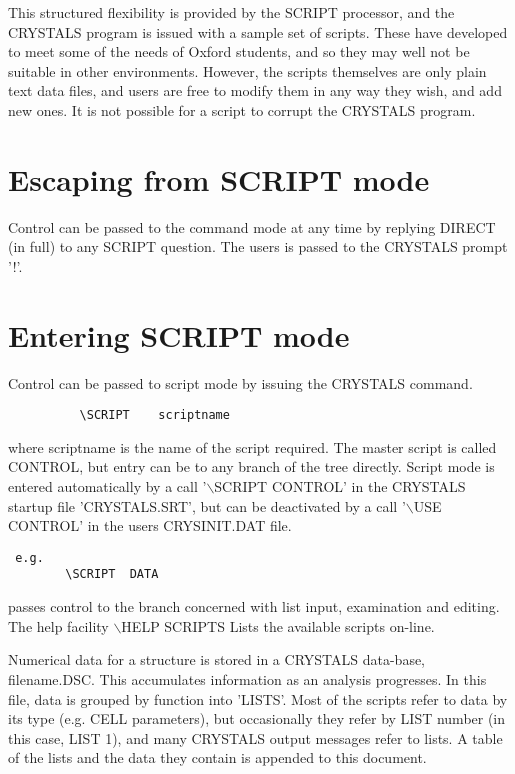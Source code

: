\documentclass[10pt,a4paper]{report}
\begin{document}
This structured flexibility is provided by the SCRIPT processor, and the CRYSTALS program is issued with a sample set of scripts. These have developed to meet some of the needs of Oxford students, and so they may well not be suitable in other environments. However, the scripts themselves are only plain text data files, and users are free to modify them in any way they wish, and add new ones. It is not possible for a script to corrupt the CRYSTALS program.

\section{Escaping from SCRIPT mode}


Control can be passed to the command mode at any time by replying DIRECT
 (in full) to any SCRIPT question. The users is passed to the CRYSTALS prompt
 '!'.



\section{Entering SCRIPT  mode}


Control can be passed to  script mode by issuing the CRYSTALS command.

\small\begin{verbatim}
          \SCRIPT    scriptname
\end{verbatim}\normalsize




where scriptname is the name of the script required. The master script is
 called CONTROL, but entry can be to any branch of the tree directly.
 Script mode is entered  automatically by a call '$\backslash$SCRIPT CONTROL' in the
 CRYSTALS startup file 'CRYSTALS.SRT', but can be deactivated by a call
 '$\backslash$USE CONTROL' in the users CRYSINIT.DAT file.

\small\begin{verbatim} e.g.
        \SCRIPT  DATA
\end{verbatim}\normalsize




passes control to the branch concerned with list input, examination
 and editing. The help facility $\backslash$HELP SCRIPTS Lists the available scripts
 on-line.



Numerical data for a structure is stored in a CRYSTALS data-base,
 filename.DSC. This accumulates information as an analysis progresses.
 In this file, data is grouped by function into 'LISTS'. Most of the
 scripts refer to data by its type (e.g. CELL parameters), but
 occasionally they refer by LIST number (in this case, LIST 1),
 and many CRYSTALS output messages
 refer to lists. A table of the lists and the data they contain is
 appended to this document.
\end{document}
